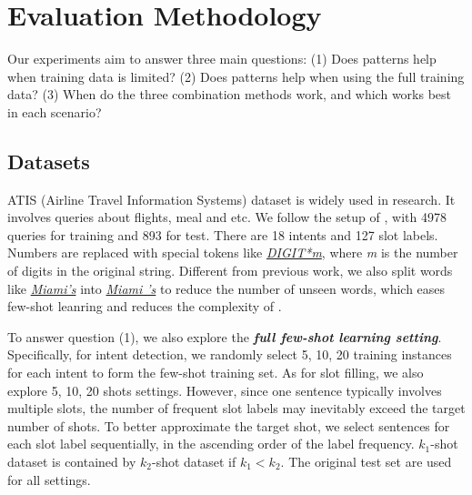 \section{Evaluation Methodology}
Our experiments aim to answer three main questions: (1) Does \RE patterns help when training data is limited? (2) Does \RE patterns help when using the full training data? (3) When do the three combination methods work, and which works best in each scenario?

\subsection{Datasets}
\label{sec_datasest}
ATIS (Airline Travel Information Systems) dataset \cite{hemphill1990atis} is widely used in \NLU research. It involves queries about flights, meal and etc. We follow the setup of \cite{liu2016attention}, with 4978 queries for training and 893 for test. There are 18 intents and 127 slot labels. Numbers are replaced with special tokens like \textsl{\underline{DIGIT*m}}, where \emph{m} is the number of digits in the original string. Different from previous work, we also split words like \textsl{\underline{Miami's}} into \textsl{\underline{Miami 's}} to reduce the number of unseen words, which eases few-shot leanring and reduces the complexity of \RE.

To answer question (1), we also explore the \textbf{\emph{full few-shot learning setting}}. Specifically, for intent detection, we randomly select 5, 10, 20 training instances for each intent to form the few-shot training set. 
As for slot filling, we also explore 5, 10, 20 shots settings. However, since one sentence typically involves multiple slots, the number of frequent slot labels may inevitably exceed the target number of shots. To better approximate the target shot, we select sentences for each slot label sequentially, in the ascending order of the label frequency.
$k_1$-shot dataset is contained by $k_2$-shot dataset if $k_1 < k_2$. 
The original test set are used for all settings.

